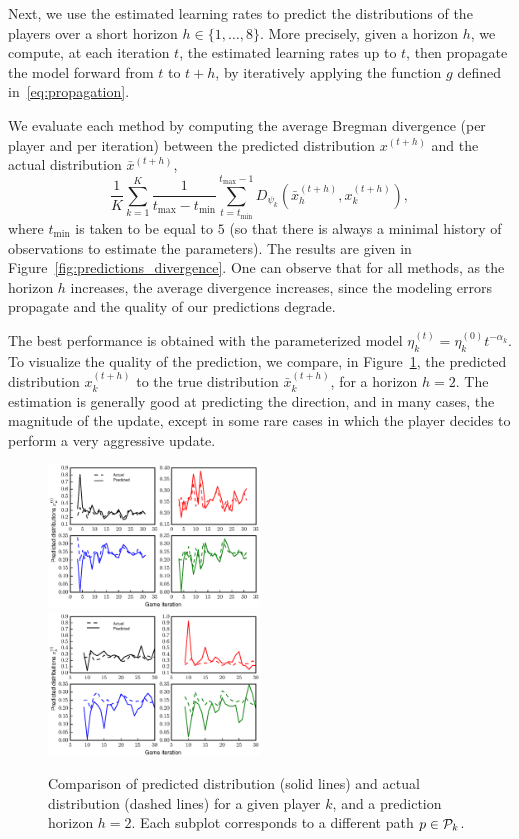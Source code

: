\documentclass{sig-alternate-ipsn13}
\begin{document}
Next, we use the estimated learning rates to predict the distributions of the players over a short horizon $h \in \{1, \dots, 8\}$. More precisely, given a horizon $h$, we compute, at each iteration $t$, the estimated learning rates up to $t$, then propagate the model forward from $t$ to $t+h$, by iteratively applying the function $g$ defined in~\eqref{eq:propagation}. 

We evaluate each method by computing the average Bregman divergence (per player and per iteration) between the predicted distribution $x^{(t+h)}$ and the actual distribution $\bar x^{(t+h)}$,
\[
\frac{1}{K} \sum_{k = 1}^K \frac{1}{t_{\max} - t_{\min}} \sum_{t = t_{\min}}^{t_{\max}-1} D_{\psi_k} (\bar x^{(t+h)}_h, x^{(t+h)}_k),
\]
where $t_{\min}$ is taken to be equal to $5$ (so that there is always a minimal history of observations to estimate the parameters). The results are given in Figure~\ref{fig:predictions_divergence}. One can observe that for all methods, as the horizon $h$ increases, the average divergence increases, since the modeling errors propagate and the quality of our predictions degrade.

The best performance is obtained with the parameterized model $\eta^{(t)}_k = \eta^{(0)}_k t^{-\alpha_k}$. To visualize the quality of the prediction, we compare, in Figure~\ref{fig:parameterized}, the predicted distribution $x^{(t+h)}_k$ to the true distribution $\bar x^{(t+h)}_k$, for a horizon $h = 2$. The estimation is generally good at predicting the direction, and in many cases, the magnitude of the update, except in some rare cases in which the player decides to perform a very aggressive update.

\begin{figure}[h]
  \centering
  \includegraphics[width=0.5\textwidth]{images/two_steps_predictions}
  \includegraphics[width=0.5\textwidth]{images/eight_steps_predictions}
  \caption{\footnotesize Comparison of predicted distribution (solid lines) and actual distribution (dashed lines) for a given player $k$, and a prediction horizon $h = 2$. Each subplot corresponds to a different path $p \in \mathcal{P}_k$.}
  \label{fig:parameterized}
\end{figure}
\end{document}
